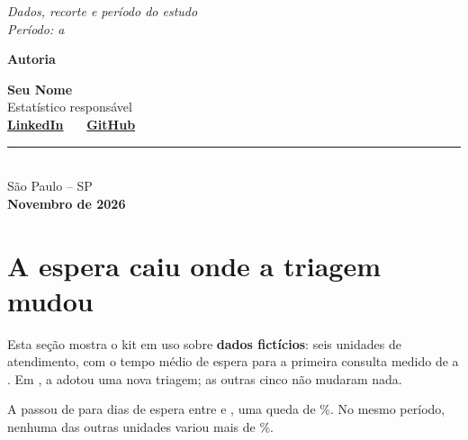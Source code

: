 \documentclass[11pt,a4paper]{article}
\newcommand{\DelimitacaoRelatorio}{Dados, recorte e período do estudo \\ Período: \NumAnoInicial{} a \NumAnoFinal}
\newcommand{\AutorNome}{Seu Nome}
\newcommand{\AutorPapel}{Estatístico responsável}
\newcommand{\AutorLinkedIn}{https://www.linkedin.com/in/seu-perfil/}
\newcommand{\AutorGitHub}{https://github.com/seu-usuario}
\newcommand{\LocalCapa}{São Paulo -- SP}
\newcommand{\DataCapa}{Novembro de 2026}
\begin{document}
\begin{titlepage}
  \vspace{1.0cm}

  {\large\itshape\color{tinta2} \DelimitacaoRelatorio \par}

  \vspace{2.2cm}

  {\large\bfseries\color{azul} Autoria} \\[0.6cm]

  \begin{minipage}{0.85\textwidth}
    \centering
    {\large\bfseries \AutorNome} \\
    {\normalsize\color{tinta2} \AutorPapel} \\[0.15cm]
    {\footnotesize
     \href{\AutorLinkedIn}{\color{vermelho}\textbf{LinkedIn}} \ \textperiodcentered\ \
     \href{\AutorGitHub}{\color{vermelho}\textbf{GitHub}}}
  \end{minipage}

  \vfill

  {\color{tinta2}\rule{4cm}{0.5pt}} \\[0.3cm]
  {\small\color{tinta2} \LocalCapa \\ \bfseries \DataCapa}
\end{titlepage}


\section{A espera caiu onde a triagem mudou}

Esta seção mostra o kit em uso sobre \textbf{dados fictícios}: seis
unidades de atendimento, com o tempo médio de espera para a primeira
consulta medido de \NumAnoInicial{} a \NumAnoFinal. Em \NumAnoMudanca, a \NumFoco{} adotou uma
nova triagem; as outras cinco não mudaram nada.

\begin{destaque}
  A \NumFoco{} passou de \NumEsperaAntes{} para \NumEsperaDepois{} dias de
  espera entre \NumAnoAntes{} e \NumAnoFinal, uma queda de
  \NumQuedaFoco\%. No mesmo período, nenhuma das outras unidades variou
  mais de \NumVarOutrasMax\%.
\end{destaque}
\end{document}
